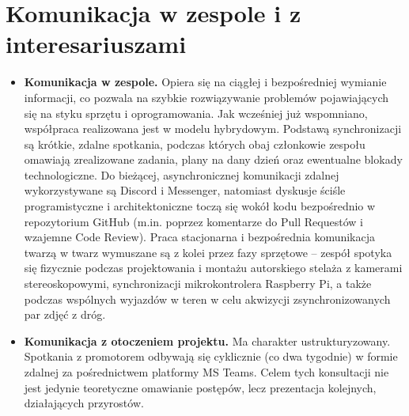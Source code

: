 \documentclass[11pt, a4paper]{article}
\begin{document}
\section{Komunikacja w zespole i z interesariuszami}
\begin{itemize}
    \item \textbf{Komunikacja w zespole.} Opiera się na ciągłej i bezpośredniej wymianie informacji, co pozwala na szybkie rozwiązywanie problemów pojawiających się na styku sprzętu i oprogramowania. Jak wcześniej już wspomniano, współpraca realizowana jest w modelu hybrydowym. Podstawą synchronizacji są krótkie, zdalne spotkania, podczas których obaj członkowie zespołu omawiają zrealizowane zadania, plany na dany dzień oraz ewentualne blokady technologiczne. Do bieżącej, asynchronicznej komunikacji zdalnej wykorzystywane są Discord i Messenger, natomiast dyskusje ściśle programistyczne i architektoniczne toczą się wokół kodu bezpośrednio w repozytorium GitHub (m.in. poprzez komentarze do Pull Requestów i wzajemne Code Review). Praca stacjonarna i bezpośrednia komunikacja twarzą w twarz wymuszane są z kolei przez fazy sprzętowe – zespół spotyka się fizycznie podczas projektowania i montażu autorskiego stelaża z kamerami stereoskopowymi, synchronizacji mikrokontrolera Raspberry Pi, a także podczas wspólnych wyjazdów w teren w celu akwizycji zsynchronizowanych par zdjęć z dróg.
    \item \textbf{Komunikacja z otoczeniem projektu.} Ma charakter ustrukturyzowany. Spotkania z promotorem odbywają się cyklicznie (co dwa tygodnie) w formie zdalnej za pośrednictwem platformy MS Teams. Celem tych konsultacji nie jest jedynie teoretyczne omawianie postępów, lecz prezentacja kolejnych, działających przyrostów.
\end{itemize}
\end{document}
